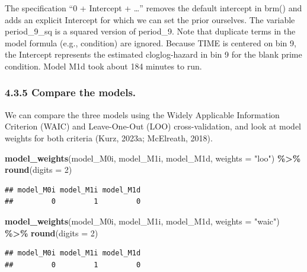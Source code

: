 \documentclass[
  man, donotrepeattitle,floatsintext]{apa6}
\newenvironment{Shaded}{\begin{snugshade}}{\end{snugshade}}
\newcommand{\AttributeTok}[1]{\textcolor[rgb]{0.13,0.29,0.53}{#1}}
\newcommand{\DecValTok}[1]{\textcolor[rgb]{0.00,0.00,0.81}{#1}}
\newcommand{\FunctionTok}[1]{\textcolor[rgb]{0.13,0.29,0.53}{\textbf{#1}}}
\newcommand{\NormalTok}[1]{#1}
\newcommand{\SpecialCharTok}[1]{\textcolor[rgb]{0.81,0.36,0.00}{\textbf{#1}}}
\newcommand{\StringTok}[1]{\textcolor[rgb]{0.31,0.60,0.02}{#1}}
\begin{document}
The specification ``0 + Intercept + \ldots{}'' removes the default intercept in brm() and adds an explicit Intercept for which we can set the prior ourselves. The variable period\_9\_sq is a squared version of period\_9. Note that duplicate terms in the model formula (e.g., condition) are ignored.
Because TIME is centered on bin 9, the Intercept represents the estimated cloglog-hazard in bin 9 for the blank prime condition. Model M1d took about 184 minutes to run.

\subsubsection{4.3.5 Compare the models.}\label{compare-the-models.}

We can compare the three models using the Widely Applicable Information Criterion (WAIC) and Leave-One-Out (LOO) cross-validation, and look at model weights for both criteria (Kurz, 2023a; McElreath, 2018).

\footnotesize

\begin{Shaded}
\begin{Highlighting}[]
\FunctionTok{model\_weights}\NormalTok{(model\_M0i, model\_M1i, model\_M1d, }\AttributeTok{weights =} \StringTok{"loo"}\NormalTok{) }\SpecialCharTok{\%\textgreater{}\%} \FunctionTok{round}\NormalTok{(}\AttributeTok{digits =} \DecValTok{2}\NormalTok{)}
\end{Highlighting}
\end{Shaded}

\begin{verbatim}
## model_M0i model_M1i model_M1d 
##         0         1         0
\end{verbatim}

\begin{Shaded}
\begin{Highlighting}[]
\FunctionTok{model\_weights}\NormalTok{(model\_M0i, model\_M1i, model\_M1d, }\AttributeTok{weights =} \StringTok{"waic"}\NormalTok{) }\SpecialCharTok{\%\textgreater{}\%} \FunctionTok{round}\NormalTok{(}\AttributeTok{digits =} \DecValTok{2}\NormalTok{) }
\end{Highlighting}
\end{Shaded}

\begin{verbatim}
## model_M0i model_M1i model_M1d 
##         0         1         0
\end{verbatim}

\normalsize
\end{document}
